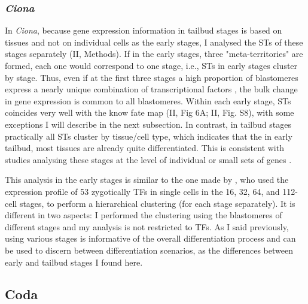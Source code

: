 \subsubsection{\textit{Ciona}}
In \textit{Ciona}, because gene expression information in tailbud stages is based on tissues and not on individual cells as the early stages, I analysed the STs of these stages separately (II, Methods). 
%
If in the early stages, three "meta-territories" are formed, each one would correspond to one stage, i.e., STs in early stages cluster by stage.
Thus, even if at the first three stages a high proportion of blastomeres express a nearly unique combination of transcriptional factors \citep{Imai2006}, the bulk change in gene expression is common to all blastomeres. Within each early stage, STs coincides very well with the know fate map (II, Fig 6A; II, Fig. S8), with some exceptions I will describe in the next subsection.
%
In contrast, in tailbud stages practically all STs cluster by tissue/cell type, which indicates that the in early tailbud, most tissues are already quite differentiated.
This is consistent with studies analysing these stages at the level of individual or small sets of genes \citep{Corbo1997,DiGregorio1999}.

This analysis in the early stages is similar to the one made by \citet{Imai2006}, who used the expression profile of 53 zygotically TFs in single cells in the 16, 32, 64, and 112-cell stages, to perform a hierarchical clustering (for each stage separately). 
It is different in two aspects: I performed the clustering using the blastomeres of different stages and my analysis is not restricted to TFs. As I said previously, using various stages is informative of the overall differentiation process and can be used to discern between differentiation scenarios, as the differences between early and tailbud stages I found here.


\subsection{Coda}

